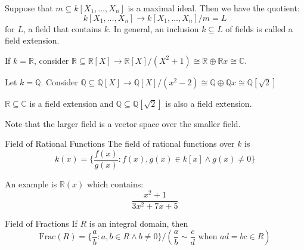 \documentclass{report}
\begin{document}
Suppose that $m \subseteq k[X_{1}, \ldots, X_{n}]$ is a maximal ideal. Then we have the quotient:
    \begin{equation*}
        k[X_{1}, \ldots, X_{n} ] \rightarrow k[X_{1}, \ldots, X_{n}]/m = L
    \end{equation*}
for $L$, a field that contains $k$. In general, an inclusion $k \subseteq L$ of fields is called a field extension.
    \begin{examples}
        \begin{example}
            If $k = \mathbb{R}$, consider $\mathbb{R} \subseteq \mathbb{R}[X] \rightarrow \mathbb{R}[X]/(X^{2} + 1) \cong \mathbb{R} \oplus \mathbb{R}x \cong \mathbb{C}$.
        \end{example}
        \begin{example}
            Let $k = \mathbb{Q}$. Consider $\mathbb{Q} \subseteq \mathbb{Q}[X] \rightarrow \mathbb{Q}[X]/(x^{2} - 2) \cong \mathbb{Q} \oplus \mathbb{Q}x \cong \mathbb{Q}[\sqrt{2}]$
        \end{example}
        \begin{example}
            $\mathbb{R} \subseteq \mathbb{C}$ is a field extension and $\mathbb{Q} \subseteq \mathbb{Q}[\sqrt{2}]$ is also a field extension.
        \end{example}
    \end{examples}
Note that the larger field is a vector space over the smaller field.

\begin{definition}{Field of Rational Functions}
    The field of rational functions over $k$ is
        \begin{equation*}
            k(x) = \{\dfrac{f(x)}{g(x)} : f(x), g(x) \in k[x] \land  g(x) \neq 0\}
        \end{equation*}
\end{definition}

An example is $\mathbb{R}(x)$ which contains:
    \begin{equation*}
        \dfrac{x^{2} + 1}{3x^{2} + 7x + 5}
    \end{equation*}

\begin{definition}{Field of Fractions}
    If $R$ is an integral domain, then 
        \begin{equation*}
            \text{Frac}(R) = \{\dfrac{a}{b}: a, b \in R \land b \neq 0\}/(\dfrac{a}{b} \sim \dfrac{c}{d} \text{ when } ad = bc \in R)
        \end{equation*}
\end{definition}
\end{document}
